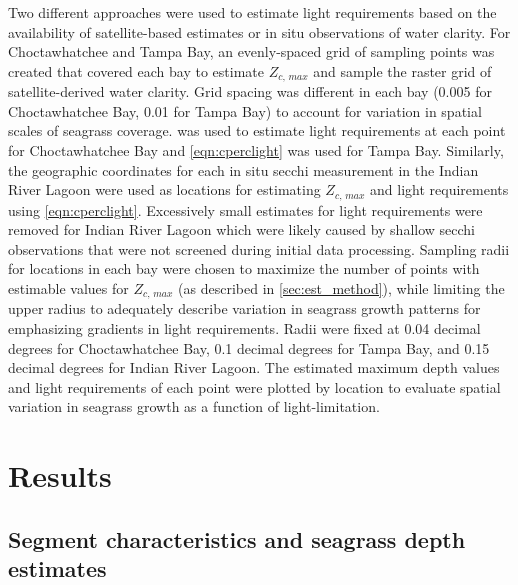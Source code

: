 \documentclass[letterpaper,12pt,oneside]{article}\usepackage[]{graphicx}\usepackage[]{color}
\begin{document}
Two different approaches were used to estimate light requirements based on the availability of satellite-based estimates or in situ observations of water clarity.  For Choctawhatchee and Tampa Bay, an evenly-spaced grid of sampling points was created that covered each bay to estimate $Z_{c,\,max}$ and sample the raster grid of satellite-derived water clarity.  Grid spacing was different in each bay (0.005 for Choctawhatchee Bay, 0.01 for Tampa Bay) to account for variation in spatial scales of seagrass coverage.   was used to estimate light requirements at each point for Choctawhatchee Bay and \cref{eqn:cperclight} was used for Tampa Bay.  Similarly, the geographic coordinates for each in situ secchi measurement in the Indian River Lagoon were used as locations for estimating $Z_{c,\,max}$ and light requirements using \cref{eqn:cperclight}.  Excessively small estimates for light requirements were removed for Indian River Lagoon which were likely caused by shallow secchi observations that were not screened during initial data processing.  Sampling radii for locations in each bay were chosen to maximize the number of points with estimable values for $Z_{c,\,max}$ (as described in \cref{sec:est_method}), while limiting the upper radius to adequately describe variation in seagrass growth patterns for emphasizing gradients in light requirements. Radii were fixed at 0.04 decimal degrees for Choctawhatchee Bay, 0.1 decimal degrees for Tampa Bay, and 0.15 decimal degrees for Indian River Lagoon.  The estimated maximum depth values and light requirements of each point were plotted by location to evaluate spatial variation in seagrass growth as a function of light-limitation.

\section{Results}

\subsection{Segment characteristics and seagrass depth estimates}

\end{document}
